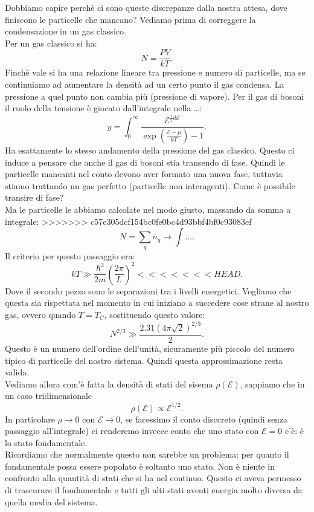 Dobbiamo capire perchè ci sono queste discrepanze dalla nostra attesa, dove finiscono le particelle che mancano? Vediamo prima di correggere la condensazione in un gas classico.\\
Per un gas classico si ha:
\[
	N = \frac{PV}{kT}
.\] 
Finchè vale si ha una relazione lineare tra pressione e numero di particelle, ma se continuiamo ad aumentare la densità ad un certo punto il gas condensa. La pressione a quel punto non cambia più (pressione di vapore). Per il gas di bosoni il ruolo della tensione è giocato dall'integrale nella \ldots:
\[
	y =\int_{0}^{\infty} \frac{\mathcal{E} ^{\frac{1}{2}d\mathcal{E} }}{\exp\left( \frac{\mathcal{E} -\mu }{kT} \right)-1 } 
.\] 
Ha esattamente lo stesso andamento della pressione del gas classico. Questo ci induce a pensare che anche il gas di bosoni stia transendo di fase. Quindi le particelle mancanti nel conto devono aver formato una nuova fase, tuttavia stiamo trattando un gas perfetto (particelle non interagenti). Come è possibile transire di fase? \\
Ma le particelle le abbiamo calcolate nel modo giusto, massando da somma a integrale:
>>>>>>> c57e305dcf154bc0fe0bc4d93bbf4bf0c93083ef
\[
	N = \sum_{q}^{} \overline{n}_{q} \to \int\ldots
.\] 
Il criterio per questo passaggio era:  \[
	kT \gg \frac{\hbar^2}{2m}\left( \frac{2\pi}{L} \right) ^2
<<<<<<< HEAD
.\] Dove il secondo pezzo sono le separazioni tra i livelli energetici. Vogliamo che questa sia rispettata nel momento in cui iniziano a succedere cose strane al nostro gas, ovvero quando $T = T_{C}$, sostituendo questo valore:
\[
	N^{2 /3} \gg \frac{2.31 \left( 4\pi\sqrt{2}  \right)^{2 /3}}{2}
.\] 
Questo è un numero dell'ordine dell'unità, sicuramente più piccolo del numero tipico di particelle del nostro sistema. Quindi questa approssimazione resta valida.\\
Vediamo allora com'è fatta la densità di stati del sisema $\rho ( \mathcal{E} ) $, sappiamo che in un caso tridimensionale  
\[
	\rho ( \mathcal{E} ) \propto \mathcal{E} ^{1 /2}
.\] 
In particolare $\rho \to 0$ con $\mathcal{E} \to 0$, se facessimo il conto disccreto (quindi senza passaggio all'integrale) ci renderemo invecce conto che uno stato con $\mathcal{E} = 0 $ c'è: è lo stato fondamentale. \\
Ricordiamo che normalmente questo non sarebbe un problema: per quanto il fondamentale possa essere popolato è soltanto uno stato. Non è niente in confronto alla quantità di stati che si ha nel continuo. Questo ci aveva permesso di trascurare il fondamentale e tutti gli alti stati aventi energia molto diversa da quella media del sistema.\\
